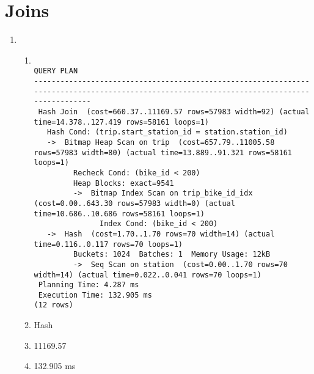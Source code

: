 \documentclass{homework}
\begin{document}
\section{Joins}

\begin{enumerate}
    \item \begin{enumerate}
        \item \begin{verbatim}
                                                                QUERY PLAN
-------------------------------------------------------------------------------------------------------------------------------------------
 Hash Join  (cost=660.37..11169.57 rows=57983 width=92) (actual time=14.378..127.419 rows=58161 loops=1)
   Hash Cond: (trip.start_station_id = station.station_id)
   ->  Bitmap Heap Scan on trip  (cost=657.79..11005.58 rows=57983 width=80) (actual time=13.889..91.321 rows=58161 loops=1)
         Recheck Cond: (bike_id < 200)
         Heap Blocks: exact=9541
         ->  Bitmap Index Scan on trip_bike_id_idx  (cost=0.00..643.30 rows=57983 width=0) (actual time=10.686..10.686 rows=58161 loops=1)
               Index Cond: (bike_id < 200)
   ->  Hash  (cost=1.70..1.70 rows=70 width=14) (actual time=0.116..0.117 rows=70 loops=1)
         Buckets: 1024  Batches: 1  Memory Usage: 12kB
         ->  Seq Scan on station  (cost=0.00..1.70 rows=70 width=14) (actual time=0.022..0.041 rows=70 loops=1)
 Planning Time: 4.287 ms
 Execution Time: 132.905 ms
(12 rows)
\end{verbatim}
        \item Hash
        \item 11169.57
        \item 132.905 ms
    \end{enumerate}


\end{enumerate}
\end{document}
